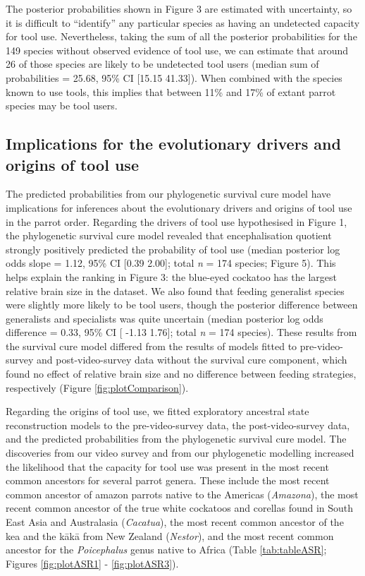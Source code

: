 \documentclass[
  man, donotrepeattitle,floatsintext]{apa6}
\begin{document}
The posterior probabilities shown in Figure 3 are
estimated with uncertainty, so it is difficult to ``identify'' any particular
species as having an undetected capacity for tool use. Nevertheless, taking the
sum of all the posterior probabilities for the
149 species without
observed evidence of tool use, we can estimate that around
26 of those species are likely to be
undetected tool users (median sum of probabilities =
25.68, 95\% CI
{[}15.15
41.33{]}). When combined with the
species known to use tools, this implies that between 11\% and 17\% of extant
parrot species may be tool users.

\hypertarget{implications-for-the-evolutionary-drivers-and-origins-of-tool-use}{%
\subsection{Implications for the evolutionary drivers and origins of tool use}\label{implications-for-the-evolutionary-drivers-and-origins-of-tool-use}}

The predicted probabilities from our phylogenetic survival cure model have
implications for inferences about the evolutionary drivers and origins of tool
use in the parrot order. Regarding the drivers of tool use hypothesised in
Figure 1, the phylogenetic survival cure model revealed that
encephalisation quotient strongly positively predicted the probability of tool
use (median posterior log odds slope = 1.12, 95\%
CI {[}0.39
2.00{]}; total \emph{n} = 174
species; Figure 5). This helps explain the ranking in
Figure 3: the blue-eyed cockatoo has the largest relative
brain size in the dataset. We also found that feeding generalist species were
slightly more likely to be tool users, though the posterior difference between
generalists and specialists was quite uncertain (median posterior log odds
difference = 0.33, 95\% CI {[}
-1.13 1.76{]}; total
\emph{n} = 174 species). These results from the survival cure model
differed from the results of models fitted to pre-video-survey and
post-video-survey data without the survival cure component, which found no
effect of relative brain size and no difference between feeding strategies,
respectively (Figure \ref{fig:plotComparison}).

Regarding the origins of tool use, we fitted exploratory ancestral state
reconstruction models to the pre-video-survey data, the post-video-survey data,
and the predicted probabilities from the phylogenetic survival cure model. The
discoveries from our video survey and from our phylogenetic modelling increased
the likelihood that the capacity for tool use was present in the most recent
common ancestors for several parrot genera. These include the most recent common
ancestor of amazon parrots native to the Americas (\emph{Amazona}), the most recent
common ancestor of the true white cockatoos and corellas found in South East
Asia and Australasia (\emph{Cacatua}), the most recent common ancestor of the kea and
the kākā from New Zealand (\emph{Nestor}), and the most recent common ancestor for
the \emph{Poicephalus} genus native to Africa (Table \ref{tab:tableASR};
Figures \ref{fig:plotASR1} - \ref{fig:plotASR3}).
\end{document}

